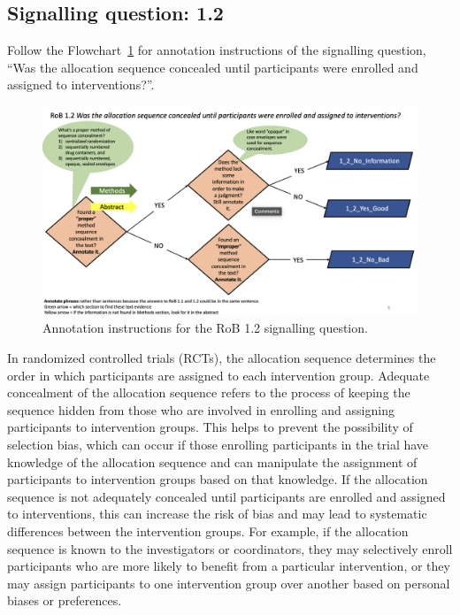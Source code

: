 \documentclass[sn-mathphys,Numbered]{sn-jnl}%
\begin{document}
\subsection*{Signalling question: 1.2}
%
Follow the Flowchart~\ref{fig:1_2} for annotation instructions of the signalling question, ``Was the allocation sequence concealed until participants were enrolled and assigned to interventions?''.
%
\begin{figure}[hbt]
    \centering
    \includegraphics[width=\textwidth]{figures/1_2.png}
    \caption{Annotation instructions for the RoB 1.2 signalling question.}
    \label{fig:1_2}
\end{figure}


In randomized controlled trials (RCTs), the allocation sequence determines the order in which participants are assigned to each intervention group.
Adequate concealment of the allocation sequence refers to the process of keeping the sequence hidden from those who are involved in enrolling and assigning participants to intervention groups.
This helps to prevent the possibility of selection bias, which can occur if those enrolling participants in the trial have knowledge of the allocation sequence and can manipulate the assignment of participants to intervention groups based on that knowledge.
If the allocation sequence is not adequately concealed until participants are enrolled and assigned to interventions, this can increase the risk of bias and may lead to systematic differences between the intervention groups.
For example, if the allocation sequence is known to the investigators or coordinators, they may selectively enroll participants who are more likely to benefit from a particular intervention, or they may assign participants to one intervention group over another based on personal biases or preferences.
\end{document}
